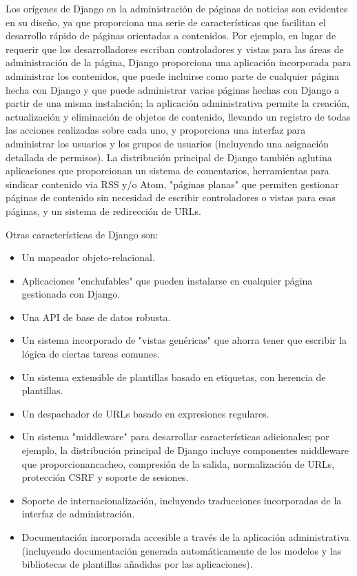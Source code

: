 Los orígenes de Django en la administración de páginas de noticias son evidentes en su diseño, ya que proporciona una serie de características que facilitan el desarrollo rápido de páginas orientadas a contenidos. Por ejemplo, en lugar de requerir que los desarrolladores escriban controladores y vistas para las áreas de administración de la página, Django proporciona una aplicación incorporada para administrar los contenidos, que puede incluirse como parte de cualquier página hecha con Django y que puede administrar varias páginas hechas con Django a partir de una misma instalación; la aplicación administrativa permite la creación, actualización y eliminación de objetos de contenido, llevando un registro de todas las acciones realizadas sobre cada uno, y proporciona una interfaz para administrar los usuarios y los grupos de usuarios (incluyendo una asignación detallada de permisos).
La distribución principal de Django también aglutina aplicaciones que proporcionan un sistema de comentarios, herramientas para sindicar contenido via RSS y/o Atom, "páginas planas" que permiten gestionar páginas de contenido sin necesidad de escribir controladores o vistas para esas páginas, y un sistema de redirección de URLs.

Otras características de Django son:
\setlength{\parskip}{0mm}
\begin{itemize}

	\item Un mapeador objeto-relacional.
	
	\item Aplicaciones "enchufables" que pueden instalarse en cualquier página gestionada con Django.
	
	\item Una API de base de datos robusta.
	
	\item Un sistema incorporado de "vistas genéricas" que ahorra tener que escribir la lógica de ciertas tareas comunes.
	
	\item Un sistema extensible de plantillas basado en etiquetas, con herencia de plantillas.
	
	\item Un despachador de URLs basado en expresiones regulares.
	
	\item Un sistema "middleware" para desarrollar características adicionales; por ejemplo, la distribución principal de Django incluye componentes middleware que proporcionancacheo, compresión de la salida, normalización de URLs, protección CSRF y soporte de sesiones.
	
	\item Soporte de internacionalización, incluyendo traducciones incorporadas de la interfaz de administración.
	
	\item Documentación incorporada accesible a través de la aplicación administrativa (incluyendo documentación generada automáticamente de los modelos y las bibliotecas de plantillas añadidas por las aplicaciones).


	
	
\end{itemize}

